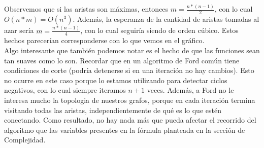 Observemos que si las aristas son máximas, entonces $m = \frac{n*(n-1)}{2}$, con lo cual $O(n*m) = O(n^3)$. Además, la esperanza de la cantidad de aristas tomadas al azar sería $m = \frac{n*(n-1)}{4}$, con lo cual seguiría siendo de orden cúbico. Estos hechos parecerían corresponderse con lo que vemos en el gráfico. \\

Algo interesante que también podemos notar es el hecho de que las funciones sean tan suaves como lo son. Recordar que en un algoritmo de Ford común tiene condiciones de corte (podría detenerse si en una iteración no hay cambios). Esto no ocurre en este caso porque lo estamos utilizando para detectar ciclos negativos, con lo cual siempre iteramos $n+1$ veces. Además, a Ford no le interesa mucho la topologia de nuestros grafos, porque en cada iteración termina visitando todas las aristas, independientemente  de qué es lo que estén conectando. Como resultado, no hay nada más que pueda afectar el recorrido del algoritmo que las variables presentes en la fórmula planteada en la sección de Complejidad.